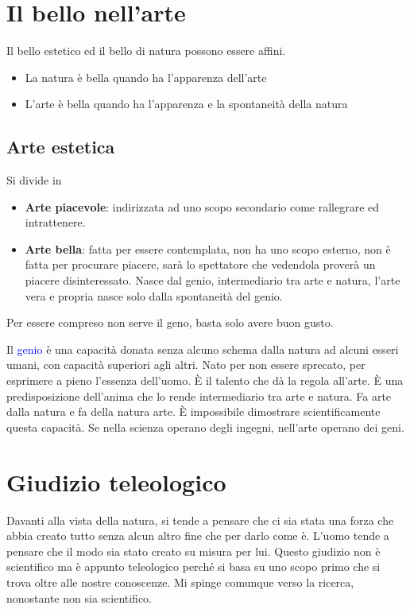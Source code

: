\documentclass[a4paper, twoside, titlepage]{book}
\renewcommand{\emph}[1]{\textcolor{blue}{#1}}
\begin{document}
\section{Il bello nell'arte}

Il bello estetico ed il bello di natura possono essere affini.

\begin{itemize}
\item La natura è bella quando ha l’apparenza dell’arte
\item L’arte è bella quando ha l’apparenza e la spontaneità della natura
\end{itemize}

\subsection{Arte estetica}

Si divide in
\begin{itemize}
\item \textbf{Arte piacevole}: indirizzata ad uno scopo secondario come rallegrare ed intrattenere.
\item \textbf{Arte bella}: fatta per essere contemplata, non ha uno scopo esterno, non è fatta per procurare piacere, sarà lo spettatore che vedendola proverà un piacere disinteressato. Nasce dal genio, intermediario tra arte e natura, l’arte vera e propria nasce solo dalla spontaneità del genio.
\end{itemize}

Per essere compreso non serve il geno, basta solo avere buon gusto.

Il \emph{genio} è una capacità donata senza alcuno schema dalla natura ad alcuni esseri umani, con capacità superiori agli altri. Nato per non essere sprecato, per esprimere a pieno l’essenza dell’uomo. È il talento che dà la regola all’arte. È una predisposizione dell’anima che lo rende intermediario tra arte e natura. Fa arte dalla natura e fa della natura arte. È impossibile dimostrare scientificamente questa capacità. Se nella scienza operano degli ingegni, nell’arte operano dei geni.

\section{Giudizio teleologico}

Davanti alla vista della natura, si tende a pensare che ci sia stata una forza che abbia creato tutto senza alcun altro fine che per darlo come è. L’uomo tende a pensare che il modo sia stato creato su misura per lui.
Questo giudizio non è scientifico ma è appunto teleologico perché si basa su uno scopo primo che si trova oltre alle nostre conoscenze. Mi spinge comunque verso la ricerca, nonostante non sia scientifico.
\end{document}
